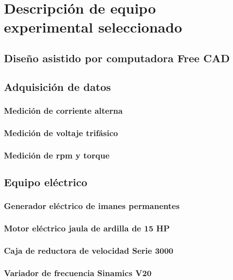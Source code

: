 

\chapter{Descripción de equipo experimental seleccionado }

\section{Diseño asistido por computadora Free CAD}

\section{Adquisición de datos}
\subsection{Medición de corriente alterna}
\subsection{Medición de voltaje trifásico}
\subsection{Medición de rpm y torque}
\section{Equipo eléctrico}
\subsection{Generador eléctrico de imanes permanentes} 
\subsection{Motor eléctrico jaula de ardilla de 15 HP} 
\subsection{Caja de reductora de velocidad Serie 3000} 
\subsection{Variador de frecuencia Sinamics V20} 

